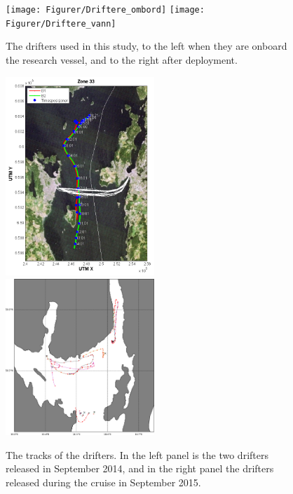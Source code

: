 \begin{figure}[ht]
\centerline{
\texttt{[image: Figurer/Driftere\_ombord]}
\texttt{[image: Figurer/Driftere\_vann]}
}
\caption{\small
The drifters used in this study, to the left when they are onboard the research vessel, and to the right after deployment.}
\label{fig:drifters_design}
\end{figure}

\begin{figure}[ht]
\centerline{
\includegraphics*[width=0.5\textwidth]{Figurer/drifters_sept2014}
\includegraphics*[width=0.5\textwidth]{Figurer/drifters_low_crop}
}
\caption{\small
The tracks of the drifters. In the left panel is the two drifters released in September 2014, and in the right panel the drifters released during the cruise in September 2015.}
\label{fig:drifters_tracks}
\end{figure}

\newpage
